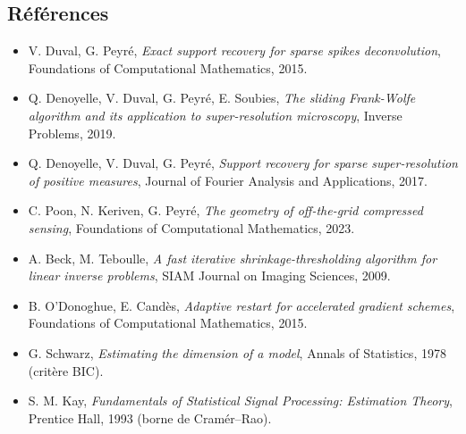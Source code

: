 \documentclass[
  french,
]{article}
\providecommand{\tightlist}{%
  \setlength{\itemsep}{0pt}\setlength{\parskip}{0pt}}
\begin{document}
\subsection{Références}\label{ruxe9fuxe9rences}

\begin{itemize}
\tightlist
\item
  V. Duval, G. Peyré, \emph{Exact support recovery for sparse spikes
  deconvolution}, Foundations of Computational Mathematics, 2015.
\item
  Q. Denoyelle, V. Duval, G. Peyré, E. Soubies, \emph{The sliding
  Frank-Wolfe algorithm and its application to super-resolution
  microscopy}, Inverse Problems, 2019.
\item
  Q. Denoyelle, V. Duval, G. Peyré, \emph{Support recovery for sparse
  super-resolution of positive measures}, Journal of Fourier Analysis
  and Applications, 2017.
\item
  C. Poon, N. Keriven, G. Peyré, \emph{The geometry of off-the-grid
  compressed sensing}, Foundations of Computational Mathematics, 2023.
\item
  A. Beck, M. Teboulle, \emph{A fast iterative shrinkage-thresholding
  algorithm for linear inverse problems}, SIAM Journal on Imaging
  Sciences, 2009.
\item
  B. O'Donoghue, E. Candès, \emph{Adaptive restart for accelerated
  gradient schemes}, Foundations of Computational Mathematics, 2015.
\item
  G. Schwarz, \emph{Estimating the dimension of a model}, Annals of
  Statistics, 1978 (critère BIC).
\item
  S. M. Kay, \emph{Fundamentals of Statistical Signal Processing:
  Estimation Theory}, Prentice Hall, 1993 (borne de Cramér--Rao).
\end{itemize}
\end{document}
